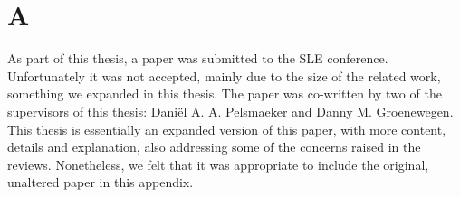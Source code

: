 
\chapter{A}\label{chap:a}

As part of this thesis, a paper was submitted to the \ac{SLE} conference.
Unfortunately it was not accepted, mainly due to the size of the related work, something we expanded in this thesis.
The paper was co-written by two of the supervisors of this thesis: Daniël A. A. Pelsmaeker and Danny M. Groenewegen.
This thesis is essentially an expanded version of this paper, with more content, details and explanation, also addressing some of the concerns raised in the reviews.
Nonetheless, we felt that it was appropriate to include the original, unaltered paper in this appendix.
